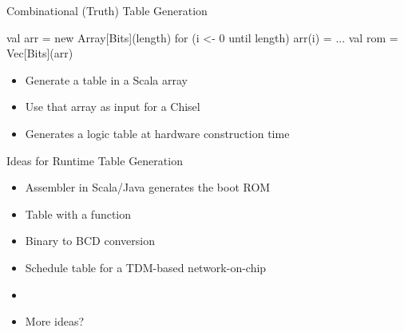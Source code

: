 %
%
%
%



\begin{frame}[fragile]{Combinational (Truth) Table Generation}
\begin{chisel}
val arr = new Array[Bits](length)
for (i <- 0 until length) {
  arr(i) = ...
}
val rom = Vec[Bits](arr)
\end{chisel}
\begin{itemize}
\item Generate a table in a Scala array
\item Use that array as input for a Chisel 
\item Generates a logic table at hardware construction time
\end{itemize}
\end{frame}

\begin{frame}[fragile]{Ideas for Runtime Table Generation}
\begin{itemize}
\item Assembler in Scala/Java generates the boot ROM
\item Table with a  function
\item Binary to BCD conversion
\item Schedule table for a TDM-based network-on-chip
\item 
\item More ideas?
\end{itemize}
\end{frame}

